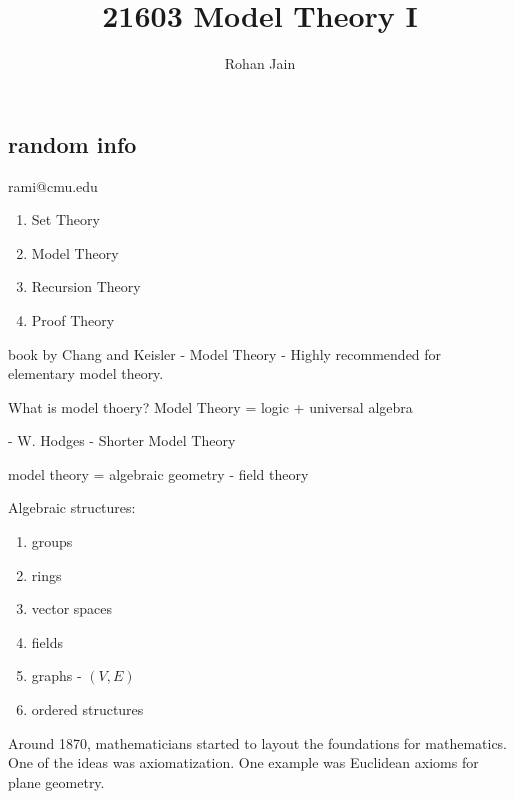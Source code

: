 \documentclass{report}
\title{\Huge{21603 Model Theory I}}
\author{\huge{Rohan Jain}}
\date{}
\begin{document}
\newcommand{\term}{\text{Term}}
\newcommand{\fml}{\text{Fml}}
\newcommand{\afml}{\text{AFml}}
\newcommand{\fv}{\text{FV}}
\newcommand{\sent}{\text{Sent}}
\newcommand{\val}{\text{Val}}
\newcommand{\Mod}{\text{Mod}}
\newcommand{\Th}{\text{Th}}
\newcommand{\tp}{\text{tp}}

\maketitle
\newpage%
\tableofcontents

\pagebreak

\chapter{}
\section{random info}
rami@cmu.edu
\begin{enumerate}
    \item Set Theory
    \item Model Theory
    \item Recursion Theory
    \item Proof Theory
\end{enumerate}

 book by Chang and Keisler - Model Theory - Highly recommended for elementary model theory. 

\noindent What is model thoery? Model Theory = logic + universal algebra

 - W. Hodges - Shorter Model Theory

\noindent model theory = algebraic geometry - field theory

\noindent Algebraic structures:
\begin{enumerate}
    \item groups
    \item rings
    \item vector spaces 
    \item fields
    \item graphs - $(V, E)$
    \item ordered structures
\end{enumerate}

Around 1870, mathematicians started to layout the foundations for mathematics. One of the ideas was axiomatization. One example was Euclidean axioms for plane geometry. 
\end{document}
